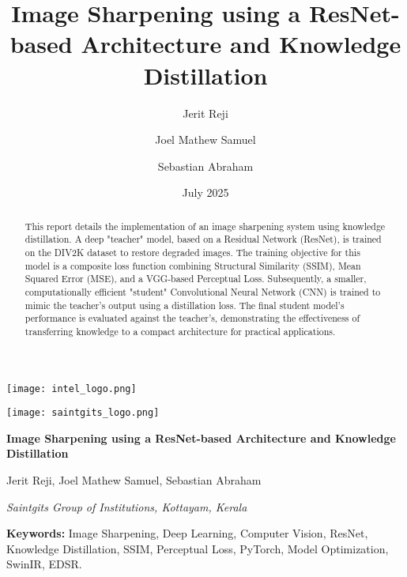 \documentclass[12pt,a4paper]{article}
\title{Image Sharpening using a ResNet-based Architecture and Knowledge Distillation}
\author[1]{Jerit Reji}
\author[1]{Joel Mathew Samuel}
\author[1]{Sebastian Abraham}
\affil[1]{Saintgits Group of Institutions, Kottayam, Kerala}
\date{July 2025}
\begin{document}
\begin{titlepage}
    \thispagestyle{firstpage}
    
    \begin{minipage}{0.5\textwidth}
        \flushleft \texttt{[image: intel\_logo.png]}
    \end{minipage}%
    \begin{minipage}{0.5\textwidth}
        \flushright \texttt{[image: saintgits\_logo.png]}
    \end{minipage}
    
    \vfill 
    \centering
    {\Huge\bfseries Image Sharpening using a ResNet-based Architecture and Knowledge Distillation \par}
    \vspace{1.5cm} 
    {\Large Jerit Reji, Joel Mathew Samuel, Sebastian Abraham \par}
    \vspace{0.5cm}
    {\large \textit{Saintgits Group of Institutions, Kottayam, Kerala}\par}
    \vfill 
    
\end{titlepage}

\restoregeometry
\pagestyle{fancy} 

\begin{abstract}
\noindent This report details the implementation of an image sharpening system using knowledge distillation. A deep "teacher" model, based on a Residual Network (ResNet), is trained on the DIV2K dataset to restore degraded images. The training objective for this model is a composite loss function combining Structural Similarity (SSIM), Mean Squared Error (MSE), and a VGG-based Perceptual Loss. Subsequently, a smaller, computationally efficient "student" Convolutional Neural Network (CNN) is trained to mimic the teacher's output using a distillation loss. The final student model's performance is evaluated against the teacher's, demonstrating the effectiveness of transferring knowledge to a compact architecture for practical applications.
\end{abstract}

\vspace{0.5cm}
\textbf{Keywords:} Image Sharpening, Deep Learning, Computer Vision, ResNet, Knowledge Distillation, SSIM, Perceptual Loss, PyTorch, Model Optimization, SwinIR, EDSR.
\vspace{1cm}
\end{document}
